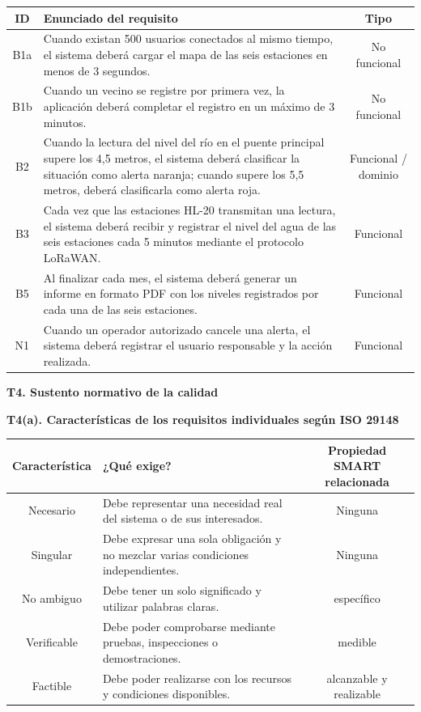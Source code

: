 \documentclass[11pt,a4paper]{article}
\newcommand{\apartado}[1]{\par\noindent\textbf{#1}\par\vspace{4pt}}
\begin{document}
\noindent\begin{tabularx}{\linewidth}{|c|Y|c|}
\hline
\textbf{ID} & \textbf{Enunciado del requisito} & \textbf{Tipo}\\
\hline
B1a & Cuando existan 500 usuarios conectados al mismo tiempo, el sistema deberá cargar el mapa de las seis estaciones en menos de 3 segundos. & No funcional\\
\hline
B1b & Cuando un vecino se registre por primera vez, la aplicación deberá completar el registro en un máximo de 3 minutos. & No funcional\\
\hline
B2 & Cuando la lectura del nivel del río en el puente principal supere los 4,5 metros, el sistema deberá clasificar la situación como alerta naranja; cuando supere los 5,5 metros, deberá clasificarla como alerta roja. & Funcional / dominio\\
\hline
B3 & Cada vez que las estaciones HL-20 transmitan una lectura, el sistema deberá recibir y registrar el nivel del agua de las seis estaciones cada 5 minutos mediante el protocolo LoRaWAN. & Funcional\\
\hline
B5 & Al finalizar cada mes, el sistema deberá generar un informe en formato PDF con los niveles registrados por cada una de las seis estaciones. & Funcional\\
\hline
N1 & Cuando un operador autorizado cancele una alerta, el sistema deberá registrar el usuario responsable y la acción realizada. & Funcional\\
\hline
\end{tabularx}

\apartado{T4. Sustento normativo de la calidad}

\textbf{T4(a). Características de los requisitos individuales según ISO 29148}

\noindent\begin{tabularx}{\linewidth}{|c|Y|c|}
\hline
\textbf{Característica} & \textbf{¿Qué exige?} & \textbf{Propiedad SMART relacionada}\\
\hline
Necesario & Debe representar una necesidad real del sistema o de sus interesados. & Ninguna\\
\hline
Singular & Debe expresar una sola obligación y no mezclar varias condiciones independientes. & Ninguna\\
\hline
No ambiguo & Debe tener un solo significado y utilizar palabras claras. & específico\\
\hline
Verificable & Debe poder comprobarse mediante pruebas, inspecciones o demostraciones. & medible\\
\hline
Factible & Debe poder realizarse con los recursos y condiciones disponibles. & alcanzable y realizable\\
\hline
\end{tabularx}
\end{document}

